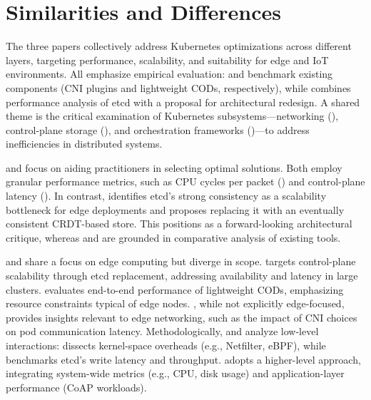 \section{Similarities and Differences}

The three papers collectively address Kubernetes optimizations across different layers, targeting performance, scalability, and suitability for edge and IoT environments. All emphasize empirical evaluation: \cite{C1} and \cite{C3} benchmark existing components (CNI plugins and lightweight CODs, respectively), while \cite{C2} combines performance analysis of etcd with a proposal for architectural redesign. A shared theme is the critical examination of Kubernetes subsystems—networking (\cite{C1}), control-plane storage (\cite{C2}), and orchestration frameworks (\cite{C3})—to address inefficiencies in distributed systems.

\cite{C1} and \cite{C3} focus on aiding practitioners in selecting optimal solutions. Both employ granular performance metrics, such as CPU cycles per packet (\cite{C1}) and control-plane latency (\cite{C3}). In contrast, \cite{C2} identifies etcd’s strong consistency as a scalability bottleneck for edge deployments and proposes replacing it with an eventually consistent CRDT-based store. This positions \cite{C2} as a forward-looking architectural critique, whereas \cite{C1} and \cite{C3} are grounded in comparative analysis of existing tools.

\cite{C2} and \cite{C3} share a focus on edge computing but diverge in scope. \cite{C2} targets control-plane scalability through etcd replacement, addressing availability and latency in large clusters. \cite{C3} evaluates end-to-end performance of lightweight CODs, emphasizing resource constraints typical of edge nodes. \cite{C1}, while not explicitly edge-focused, provides insights relevant to edge networking, such as the impact of CNI choices on pod communication latency. Methodologically, \cite{C1} and \cite{C2} analyze low-level interactions: \cite{C1} dissects kernel-space overheads (e.g., Netfilter, eBPF), while \cite{C2} benchmarks etcd’s write latency and throughput. \cite{C3} adopts a higher-level approach, integrating system-wide metrics (e.g., CPU, disk usage) and application-layer performance (CoAP workloads).